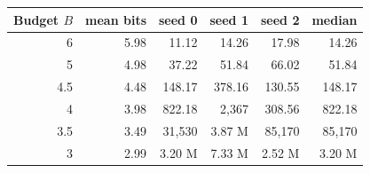 \begin{tabular}{rrrrrr}
\toprule
Budget $B$ & mean bits & seed 0 & seed 1 & seed 2 & median \\
\midrule
6 & 5.98 & 11.12 & 14.26 & 17.98 & 14.26 \\
5 & 4.98 & 37.22 & 51.84 & 66.02 & 51.84 \\
4.5 & 4.48 & 148.17 & 378.16 & 130.55 & 148.17 \\
4 & 3.98 & 822.18 & 2,367 & 308.56 & 822.18 \\
3.5 & 3.49 & 31,530 & 3.87 M & 85,170 & 85,170 \\
3 & 2.99 & 3.20 M & 7.33 M & 2.52 M & 3.20 M \\
\bottomrule
\end{tabular}
